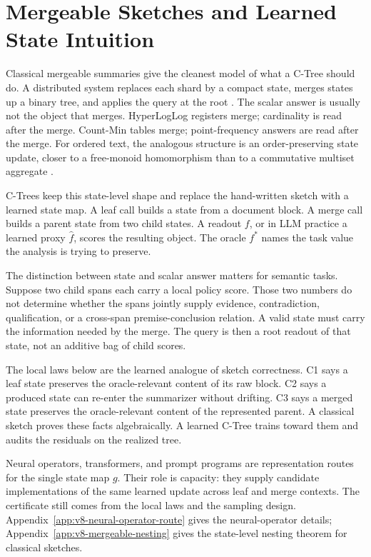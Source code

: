 \section{Mergeable Sketches and Learned State Intuition}
\label{sec:v8-mergeable-intuition}

Classical mergeable summaries give the cleanest model of what a C-Tree should
do. A distributed system replaces each shard by a compact state, merges states
up a binary tree, and applies the query at the root
\citep{Agarwal2013MergeableTODS}. The scalar answer is usually not the object
that merges. HyperLogLog registers merge; cardinality is read after the merge.
Count-Min tables merge; point-frequency answers are read after the merge.
For ordered text, the analogous structure is an order-preserving state update,
closer to a free-monoid homomorphism than to a commutative multiset aggregate
\citep{Gibbons1996ThirdHomomorphism}.

C-Trees keep this state-level shape and replace the hand-written sketch with a
learned state map. A leaf call builds a state from a document block. A merge
call builds a parent state from two child states. A readout \(f\), or in LLM
practice a learned proxy \(\widehat f\), scores the resulting object. The
oracle \(f^\ast\) names the task value the analysis is trying to preserve.

The distinction between state and scalar answer matters for semantic tasks.
Suppose two child spans each carry a local policy score. Those two numbers do
not determine whether the spans jointly supply evidence, contradiction,
qualification, or a cross-span premise-conclusion relation. A valid state must
carry the information needed by the merge. The query is then a root readout of
that state, not an additive bag of child scores.

The local laws below are the learned analogue of sketch correctness. C1 says a
leaf state preserves the oracle-relevant content of its raw block. C2 says a
produced state can re-enter the summarizer without drifting. C3 says a merged
state preserves the oracle-relevant content of the represented parent. A
classical sketch proves these facts algebraically. A learned C-Tree trains
toward them and audits the residuals on the realized tree.

Neural operators, transformers, and prompt programs are representation routes
for the single state map \(g\). Their role is capacity: they supply candidate
implementations of the same learned update across leaf and merge contexts. The
certificate still comes from the local laws and the sampling design.
Appendix~\ref{app:v8-neural-operator-route} gives the neural-operator details;
Appendix~\ref{app:v8-mergeable-nesting} gives the state-level nesting theorem
for classical sketches.
